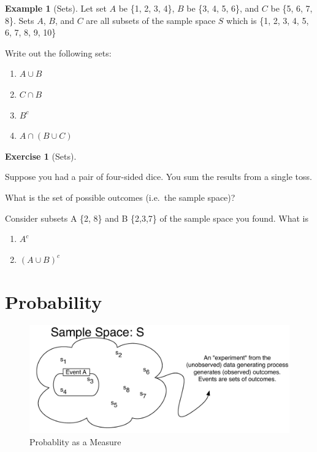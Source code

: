\documentclass[
]{book}
\providecommand{\tightlist}{%
  \setlength{\itemsep}{0pt}\setlength{\parskip}{0pt}}
\theoremstyle{definition}
\theoremstyle{definition}
\newtheorem{example}{Example}[chapter]
\theoremstyle{definition}
\newtheorem{exercise}{Exercise}[chapter]
\theoremstyle{remark}
\begin{document}
\begin{example}[Sets]
\protect\hypertarget{exm:sets}{}{\label{exm:sets} {} }
Let set \(A\) be \{1, 2, 3, 4\}, \(B\) be \{3, 4, 5, 6\}, and \(C\) be \{5, 6, 7, 8\}. Sets \(A\), \(B\), and \(C\) are all subsets of the sample space \(S\) which is \{1, 2, 3, 4, 5, 6, 7, 8, 9, 10\}

Write out the following sets:

\begin{enumerate}
\def\labelenumi{\arabic{enumi}.}
\tightlist
\item
  \(A \cup B\)
\item
  \(C \cap B\)
\item
  \(B^c\)
\item
  \(A \cap (B \cup C)\)
\end{enumerate}
\end{example}

\begin{exercise}[Sets]
\protect\hypertarget{exr:sets1}{}{\label{exr:sets1} {} }

Suppose you had a pair of four-sided dice. You sum the results from a single toss.

What is the set of possible outcomes (i.e.~the sample space)?

Consider subsets A \{2, 8\} and B \{2,3,7\} of the sample space you found. What is

\begin{enumerate}
\def\labelenumi{\arabic{enumi}.}
\tightlist
\item
  \(A^c\)
\item
  \((A \cup B)^c\)
\end{enumerate}
\end{exercise}

\hypertarget{probdef}{%
\section{Probability}\label{probdef}}

\begin{figure}
\centering
\includegraphics{images/probability.pdf}
\caption[\label{fig:prob-image}Probablity as a Measure]{\label{fig:prob-image}Probablity as a Measure\footnotemark{}}
\end{figure}
\end{document}
